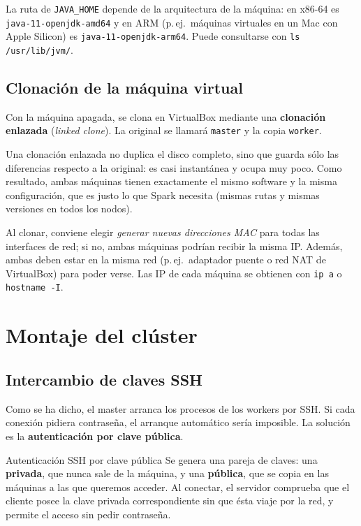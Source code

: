 \documentclass[11pt,a4paper]{article}
\begin{document}
\begin{aviso}
La ruta de \texttt{JAVA\_HOME} depende de la arquitectura de la máquina: en x86-64 es \texttt{java-11-openjdk-amd64} y en ARM (p.\,ej.\ máquinas virtuales en un Mac con Apple Silicon) es \texttt{java-11-openjdk-arm64}. Puede consultarse con \texttt{ls /usr/lib/jvm/}.
\end{aviso}

\subsection{Clonación de la máquina virtual}
Con la máquina apagada, se clona en VirtualBox mediante una \textbf{clonación enlazada} (\emph{linked clone}). La original se llamará \texttt{master} y la copia \texttt{worker}.

Una clonación enlazada no duplica el disco completo, sino que guarda sólo las diferencias respecto a la original: es casi instantánea y ocupa muy poco. Como resultado, ambas máquinas tienen exactamente el mismo software y la misma configuración, que es justo lo que Spark necesita (mismas rutas y mismas versiones en todos los nodos).

\begin{aviso}
Al clonar, conviene elegir \emph{generar nuevas direcciones MAC} para todas las interfaces de red; si no, ambas máquinas podrían recibir la misma IP. Además, ambas deben estar en la misma red (p.\,ej.\ adaptador puente o red NAT de VirtualBox) para poder verse. Las IP de cada máquina se obtienen con \texttt{ip a} o \texttt{hostname -I}.
\end{aviso}

\section{Montaje del clúster}

\subsection{Intercambio de claves SSH}

Como se ha dicho, el master arranca los procesos de los workers por SSH. Si cada conexión pidiera contraseña, el arranque automático sería imposible. La solución es la \textbf{autenticación por clave pública}.

\begin{concepto}{Autenticación SSH por clave pública}
Se genera una pareja de claves: una \textbf{privada}, que nunca sale de la máquina, y una \textbf{pública}, que se copia en las máquinas a las que queremos acceder. Al conectar, el servidor comprueba que el cliente posee la clave privada correspondiente sin que ésta viaje por la red, y permite el acceso sin pedir contraseña.
\end{concepto}
\end{document}
